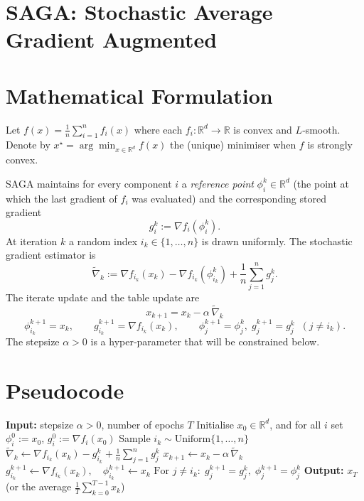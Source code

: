 \documentclass{article}
\newcommand{\R}{\mathbb{R}}
\begin{document}
\section*{SAGA: Stochastic Average Gradient Augmented}

\section*{Mathematical Formulation}
Let $f(x)=\frac1n\sum_{i=1}^{n}f_i(x)$ where each $f_i:\R^d\rightarrow\R$ is convex and $L$‑smooth.  
Denote by $x^\star=\arg\min_{x\in\R^d}f(x)$ the (unique) minimiser when $f$ is strongly convex.

SAGA maintains for every component $i$ a \emph{reference point} $\phi_i^k\in\R^d$ (the point at which the last gradient of $f_i$ was evaluated) and the corresponding stored gradient
\[
g_i^k:=\nabla f_i(\phi_i^k).
\]
At iteration $k$ a random index $i_k\in\{1,\dots,n\}$ is drawn uniformly.  
The stochastic gradient estimator is
\[
\tilde{\nabla}_k:=\nabla f_{i_k}(x_k)-\nabla f_{i_k}(\phi_{i_k}^k)+\frac1n\sum_{j=1}^{n}g_j^k .
\tag{1}
\]
The iterate update and the table update are
\[
\boxed{x_{k+1}=x_k-\alpha\,\tilde{\nabla}_k}
\tag{2}
\]
\[
\boxed{\phi_{i_k}^{k+1}=x_k,\qquad g_{i_k}^{k+1}=\nabla f_{i_k}(x_k),}
\qquad 
\phi_{j}^{k+1}=\phi_{j}^{k},\; g_{j}^{k+1}=g_{j}^{k}\;\;(j\neq i_k).
\tag{3}
\]
The stepsize $\alpha>0$ is a hyper‑parameter that will be constrained below.

\section*{Pseudocode}
\begin{algorithm}[H]
\caption{SAGA}
\begin{algorithmic}[1]
\State \textbf{Input:} stepsize $\alpha>0$, number of epochs $T$
\State Initialise $x_0\in\R^d$, and for all $i$ set $\phi_i^0:=x_0$, $g_i^0:=\nabla f_i(x_0)$
    \State Sample $i_k\sim\text{Uniform}\{1,\dots,n\}$
    \State $\tilde{\nabla}_k\gets \nabla f_{i_k}(x_k)-g_{i_k}^k+\frac1n\sum_{j=1}^{n}g_j^k$
    \State $x_{k+1}\gets x_k-\alpha\,\tilde{\nabla}_k$
    \State $g_{i_k}^{k+1}\gets \nabla f_{i_k}(x_k),\quad \phi_{i_k}^{k+1}\gets x_k$
    \State $\text{For }j\neq i_k:\; g_{j}^{k+1}=g_j^k,\;\phi_j^{k+1}=\phi_j^k$
\EndFor
\State \textbf{Output:} $x_T$ (or the average $\frac1T\sum_{k=0}^{T-1}x_k$)
\end{algorithmic}
\end{algorithm}
\end{document}
